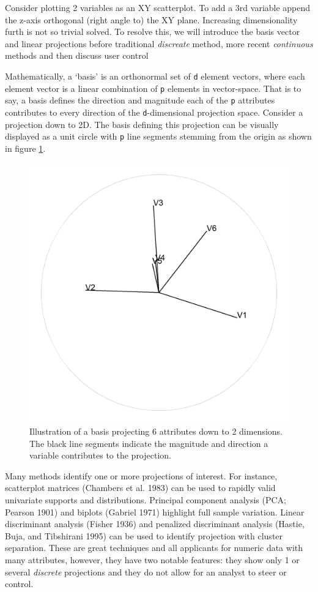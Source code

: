 \documentclass[
  11,
]{article}
\begin{document}
Consider plotting 2 variables as an XY scatterplot. To add a 3rd variable append the z-axis orthogonal (right angle to) the XY plane. Increasing dimensionality furth is not so trivial solved. To resolve this, we will introduce the basis vector and linear projections before traditional \emph{discreate} method, more recent \emph{continuous} methods and then discuss user control

Mathematically, a `basis' is an orthonormal set of \texttt{d} element vectors, where each element vector is a linear combination of \texttt{p} elements in vector-space. That is to say, a basis defines the direction and magnitude each of the \texttt{p} attributes contributes to every direction of the \texttt{d}-dimensional projection space. Consider a projection down to 2D. The basis defining this projection can be visually displayed as a unit circle with \texttt{p} line segments stemming from the origin as shown in figure \ref{fig:basis}.

\begin{figure}[h]

{\centering \includegraphics[width=0.6\linewidth,]{./figures/basis} 

}

\caption{Illustration of a basis projecting 6 attributes down to 2 dimensions. The black line segments indicate the magnitude and direction a variable contributes to the projection.}\label{fig:basis}
\end{figure}

Many methods identify one or more projections of interest. For instance, scatterplot matrices (Chambers et al. 1983) can be used to rapidly valid univariate supports and distributions. Principal component analysis (PCA; Pearson 1901) and biplots (Gabriel 1971) highlight full sample variation. Linear discriminant analysis (Fisher 1936) and penalized discriminant analysis (Hastie, Buja, and Tibshirani 1995) can be used to identify projection with cluster separation. These are great techniques and all applicants for numeric data with many attributes, however, they have two notable features: they show only 1 or several \emph{discrete} projections and they do not allow for an analyst to steer or control.
\end{document}
